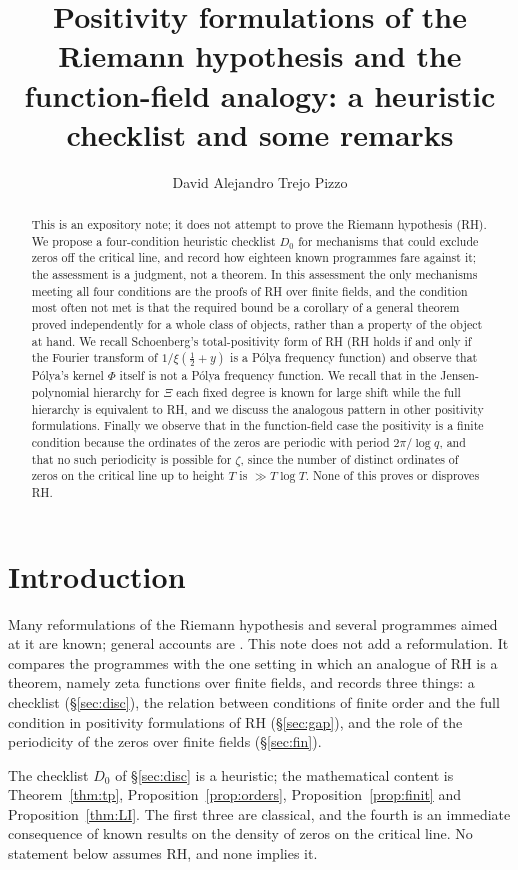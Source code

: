 \documentclass[11pt]{amsart}
\title[Positivity formulations of RH and the function-field analogy]{Positivity
formulations of the Riemann hypothesis and the function-field analogy: a
heuristic checklist and some remarks}
\author{David Alejandro Trejo Pizzo}
\theoremstyle{definition}
\theoremstyle{remark}
\begin{document}
\begin{abstract}
This is an expository note; it does not attempt to prove the Riemann
hypothesis (RH). We propose a four-condition heuristic checklist $D_0$ for
mechanisms that could exclude zeros off the critical line, and record how
eighteen known programmes fare against it; the assessment is a judgment, not a
theorem. In this assessment the only mechanisms meeting all four conditions
are the proofs of RH over finite fields, and the condition most often not met
is that the required bound be a corollary of a general theorem proved
independently for a whole class of objects, rather than a property of the
object at hand. We recall Schoenberg's total-positivity form of RH (RH holds
if and only if the Fourier transform of $1/\xi(\tfrac12+y)$ is a P\'olya
frequency function) and observe that P\'olya's kernel $\Phi$ itself is not a
P\'olya frequency function. We recall that in the Jensen-polynomial hierarchy
for $\Xi$ each fixed degree is known for large shift while the full hierarchy
is equivalent to RH, and we discuss the analogous pattern in other positivity
formulations. Finally we observe that in the function-field case the
positivity is a finite condition because the ordinates of the zeros are
periodic with period $2\pi/\log q$, and that no such periodicity is possible
for $\zeta$, since the number of distinct ordinates of zeros on the critical
line up to height $T$ is $\gg T\log T$. None of this proves or disproves RH.
\end{abstract}
\maketitle

\section{Introduction}
Many reformulations of the Riemann hypothesis and several programmes aimed at
it are known; general accounts are \cite{bgTitchmarsh,bgEdwards,bgConrey03,
bgBombieri00}. This note does not add a reformulation. It compares the
programmes with the one setting in which an analogue of RH is a theorem,
namely zeta functions over finite fields, and records three things: a
checklist (\S\ref{sec:disc}), the relation between conditions of finite order
and the full condition in positivity formulations of RH (\S\ref{sec:gap}), and
the role of the periodicity of the zeros over finite fields
(\S\ref{sec:fin}).

The checklist $D_0$ of \S\ref{sec:disc} is a heuristic; the mathematical
content is Theorem~\ref{thm:tp}, Proposition~\ref{prop:orders},
Proposition~\ref{prop:finit} and Proposition~\ref{thm:LI}. The first three are
classical, and the fourth is an immediate consequence of known results on the
density of zeros on the critical line. No statement below assumes RH, and none
implies it.
\end{document}
